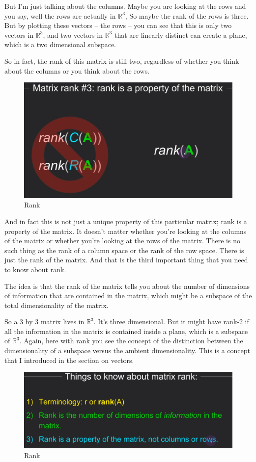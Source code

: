 \documentclass[fleqn,10pt]{olplainarticle}
\theoremstyle{definition}
\theoremstyle{remark}
\begin{document}
But I'm just talking about the columns. Maybe you are looking at the rows and you say, well the rows are actually in $\mathbb{R}^3$, So maybe the rank of the rows is three. But by plotting these vectors -- the rows -- you can see that this is only two vectors in $\mathbb{R}^3$, and two vectors in $\mathbb{R}^3$ that are linearly distinct can create a plane, which is a two dimensional subspace.

So in fact, the rank of this matrix is still two, regardless of whether you think about the columns or you think about the rows.

\begin{figure}[ht]
	\centering
	\includegraphics[width=0.4\linewidth]{images/rank-04.png}
	\caption{Rank}
	\label{fig:rank_04}
\end{figure}

And in fact this is not just a unique property of this particular matrix; rank is a property of the matrix. It doesn't matter whether you're looking at the columns of the matrix or whether you're looking at the rows of the matrix. There is no such thing as the rank of a column space or the rank of the row space. There is just the rank of the matrix. And that is the third important thing that you need to know about rank.

The idea is that the rank of the matrix tells you about the number of dimensions of information that are contained in the matrix, which might be a subspace of the total dimensionality of the matrix.

So a 3 by 3 matrix lives in $\mathbb{R}^3$. It's three dimensional. But it might have rank-2 if all the information in the matrix is contained inside a plane, which is a subspace of $\mathbb{R}^3$. Again, here with rank you see the concept of the distinction between the dimensionality of a subspace versus the ambient dimensionality. This is a concept that I introduced in the section on vectors.

\begin{figure}[ht]
	\centering
	\includegraphics[width=0.5\linewidth]{images/rank-05.png}
	\caption{Rank}
	\label{fig:rank_05}
\end{figure}
\end{document}
